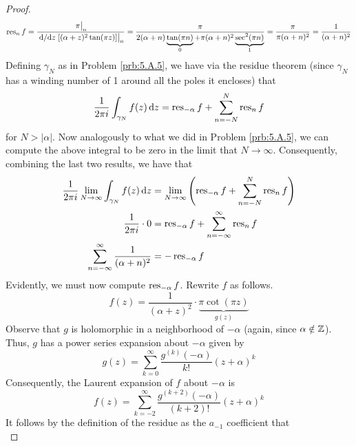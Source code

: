 \documentclass[../psets.tex]{subfiles}
\begin{document}
\begin{enumerate}[ref={A.\arabic*}]
\begin{proof}
        \begin{equation*}
            \res_nf = \frac{\eval{\pi}_n}{\eval{\dv*{z}[(\alpha+z)^2\tan(\pi z)]}_n}
            = \frac{\pi}{2(\alpha+n)\underbrace{\tan(\pi n)}_0+\pi(\alpha+n)^2\underbrace{\sec^2(\pi n)}_1}
            = \frac{\pi}{\pi(\alpha+n)^2}
            = \frac{1}{(\alpha+n)^2}
        \end{equation*}
        Defining $\gamma_N$ as in Problem \ref{prb:5.A.5}, we have via the residue theorem (since $\gamma_N$ has a winding number of 1 around all the poles it encloses) that
        \begin{equation*}
            \frac{1}{2\pi i}\int_{\gamma_N}f(z)\dd{z} = \operatorname{res}_{-\alpha}f+\sum_{n=-N}^N\operatorname{res}_nf
        \end{equation*}
        for $N>|\alpha|$. Now analogously to what we did in Problem \ref{prb:5.A.5}, we can compute the above integral to be zero in the limit that $N\to\infty$. Consequently, combining the last two results, we have that
        \begin{align*}
            \frac{1}{2\pi i}\lim_{N\to\infty}\int_{\gamma_N}f(z)\dd{z} &= \lim_{N\to\infty}\left( \operatorname{res}_{-\alpha}f+\sum_{n=-N}^N\operatorname{res}_nf \right)\\
            \frac{1}{2\pi i}\cdot 0 &= \operatorname{res}_{-\alpha}f+\sum_{n=-\infty}^\infty\operatorname{res}_nf\\
            \sum_{n=-\infty}^\infty\frac{1}{(\alpha+n)^2} &= -\operatorname{res}_{-\alpha}f
        \end{align*}
        Evidently, we must now compute $\operatorname{res}_{-\alpha}f$. Rewrite $f$ as follows.
        \begin{equation*}
            f(z) = \frac{1}{(\alpha+z)^2}\cdot\underbrace{\pi\cot(\pi z)}_{g(z)}
        \end{equation*}
        Observe that $g$ is holomorphic in a neighborhood of $-\alpha$ (again, since $\alpha\notin\mathbb{Z}$). Thus, $g$ has a power series expansion about $-\alpha$ given by
        \begin{equation*}
            g(z) = \sum_{k=0}^\infty\frac{g^{(k)}(-\alpha)}{k!}(z+\alpha)^k
        \end{equation*}
        Consequently, the Laurent expansion of $f$ about $-\alpha$ is
        \begin{equation*}
            f(z) = \sum_{k=-2}^\infty\frac{g^{(k+2)}(-\alpha)}{(k+2)!}(z+\alpha)^k
        \end{equation*}
        It follows by the definition of the residue as the $a_{-1}$ coefficient that
        \begin{equation*}

\end{equation*}
\end{proof}
\end{enumerate}
\end{document}
